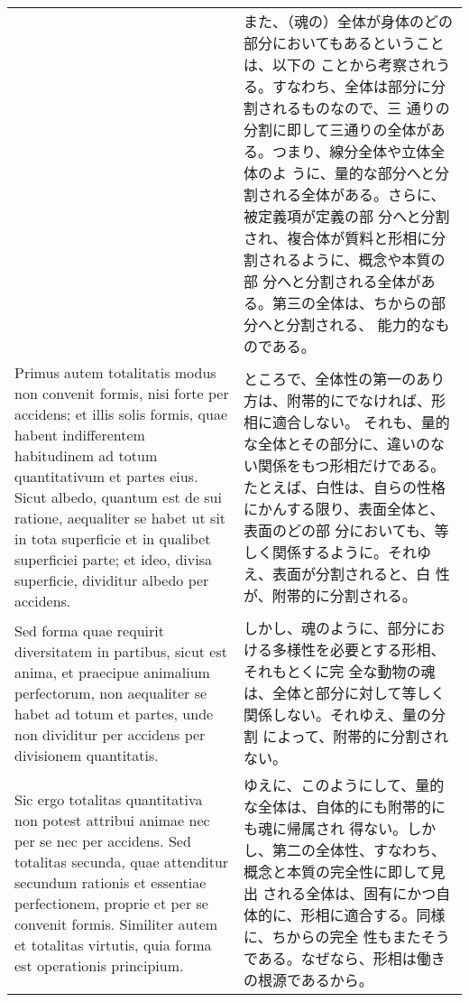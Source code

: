 \documentclass[paper=a4paper,fontsize=10pt,jafontsize=9pt,titlepage]{jlreq}
\begin{document}
\begin{longtable}{p{21em}p{21em}}
 &

 また、（魂の）全体が身体のどの部分においてもあるということは、以下の
 ことから考察されうる。すなわち、全体は部分に分割されるものなので、三
 通りの分割に即して三通りの全体がある。つまり、線分全体や立体全体のよ
 うに、量的な部分へと分割される全体がある。さらに、被定義項が定義の部
 分へと分割され、複合体が質料と形相に分割されるように、概念や本質の部
 分へと分割される全体がある。第三の全体は、ちからの部分へと分割される、
 能力的なものである。

\\

 Primus autem totalitatis modus non convenit formis, nisi forte per
 accidens; et illis solis formis, quae habent indifferentem
 habitudinem ad totum quantitativum et partes eius. Sicut albedo,
 quantum est de sui ratione, aequaliter se habet ut sit in tota
 superficie et in qualibet superficiei parte; et ideo, divisa
 superficie, dividitur albedo per accidens.

&

ところで、全体性の第一のあり方は、附帯的にでなければ、形相に適合しない。
 それも、量的な全体とその部分に、違いのない関係をもつ形相だけである。
 たとえば、白性は、自らの性格にかんする限り、表面全体と、表面のどの部
 分においても、等しく関係するように。それゆえ、表面が分割されると、白
 性が、附帯的に分割される。
  
\\

 Sed forma quae requirit diversitatem in partibus, sicut est anima, et
 praecipue animalium perfectorum, non aequaliter se habet ad totum et
 partes, unde non dividitur per accidens per divisionem quantitatis.

&

しかし、魂のように、部分における多様性を必要とする形相、それもとくに完
全な動物の魂は、全体と部分に対して等しく関係しない。それゆえ、量の分割
によって、附帯的に分割されない。
 
 
\\

 Sic ergo totalitas
 quantitativa non potest attribui animae nec per se nec per
 accidens. Sed totalitas secunda, quae attenditur secundum rationis et
 essentiae perfectionem, proprie et per se convenit formis. Similiter
 autem et totalitas virtutis, quia forma est operationis principium.

&

ゆえに、このようにして、量的な全体は、自体的にも附帯的にも魂に帰属され
得ない。しかし、第二の全体性、すなわち、概念と本質の完全性に即して見出
される全体は、固有にかつ自体的に、形相に適合する。同様に、ちからの完全
性もまたそうである。なぜなら、形相は働きの根源であるから。
 

\end{longtable}
\end{document}

